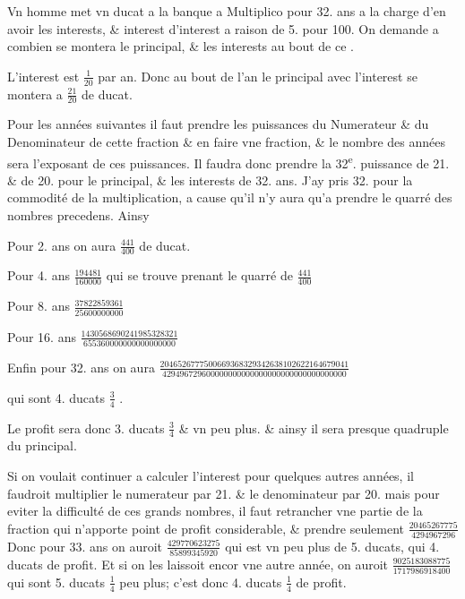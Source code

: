 \documentclass[11pt,a4paper]{article}
\begin{document}
Vn homme met vn ducat a la banque a Multiplico pour 32. ans a la charge d'en avoir les interests, \& interest d'interest a raison de 5. pour 100. On demande a combien se montera le principal, \& les interests au bout de ce .

L'interest est $\frac{1}{20}$ par an. Donc au bout de l'an le principal avec l'interest se montera a $\frac{21}{20}$ de ducat.

Pour les années suivantes il faut prendre les puissances du Numerateur \& du Denominateur de cette fraction \& en faire vne fraction, \& le nombre des années sera l'exposant de ces puissances. Il faudra donc prendre la 32\textsuperscript{e}. puissance de 21. \& de 20. pour le principal, \& les interests de 32. ans. J'ay pris 32. pour la commodité de la multiplication, a cause qu'il n'y aura qu'a prendre le quarré des nombres precedens. Ainsy

Pour 2. ans on aura $\frac{441}{400}$ de ducat.

Pour 4. ans $\frac{194481}{160000}$ qui se trouve prenant le quarré de $\frac{441}{400}$

Pour 8. ans $\frac{37822859361}{25600000000}$

Pour 16. ans $\frac{1430568690241985328321}{655360000000000000000}$

Enfin pour 32. ans \struck{\ill{}} on aura $\frac{2046526777500669368329342638102622164679041}{429496729600000000000000000000000000000000}$

qui sont 4. ducats \struck{\ill{}} $\frac{3}{4}$ .

Le profit sera donc 3. ducats $\frac{3}{4}$ \& vn peu plus. \& ainsy il sera presque quadruple du principal.

Si on voulait continuer a calculer l'interest pour quelques autres années, il faudroit multiplier le numerateur par 21. \& le denominateur par 20. mais pour eviter la difficulté de ces grands nombres, il faut retrancher vne partie de la fraction qui n'apporte point de profit considerable, \& prendre seulement $\frac{20465267775}{4294967296}$ Donc pour 33. ans on auroit $\frac{429770623275}{85899345920}$ qui est vn peu plus de 5. ducats, qui  4. ducats de profit. Et si on les laissoit encor vne autre année, on auroit $\frac{9025183088775}{1717986918400}$ qui sont 5. ducats $\frac{1}{4}$ peu plus; c'est donc 4. ducats $\frac{1}{4}$ de  profit.
\end{document}
